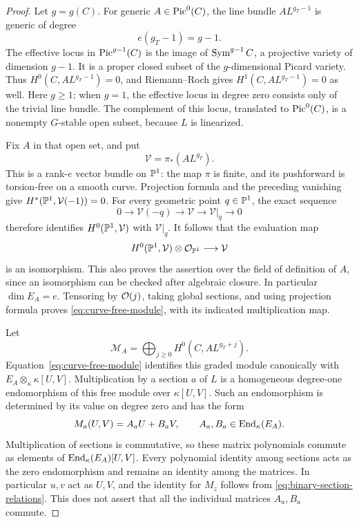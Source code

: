 \begin{proof}
Let \(g=g(C)\).  For generic \(A\in\operatorname{Pic}^0(C)\), the line bundle
\(A L^{g_T-1}\) is generic of degree
\[
 e(g_T-1)=g-1.
\]
The effective locus in \(\operatorname{Pic}^{g-1}(C)\) is the image of
\(\operatorname{Sym}^{g-1}C\), a projective variety of dimension \(g-1\).
It is a proper closed subset of the \(g\)-dimensional Picard
variety.  Thus \(H^0(C,A L^{g_T-1})=0\), and
Riemann--Roch gives \(H^1(C,A L^{g_T-1})=0\) as well.
Here \(g\ge1\); when \(g=1\), the effective locus in degree
zero consists only of the trivial line bundle.
The complement of this locus, translated to \(\operatorname{Pic}^0(C)\),
is a nonempty \(G\)-stable open subset, because \(L\) is
linearized.

Fix \(A\) in that open set, and put
\[
 \mathcal V=\pi_*(A L^{g_T}).
\]
This is a rank-\(e\) vector bundle on \(\mathbb P^1\): the map
\(\pi\) is finite, and its pushforward is torsion-free on a
smooth curve.  Projection formula and the preceding
vanishing give \(H^*(\mathbb P^1,\mathcal V(-1))=0\).
For every geometric point \(q\in\mathbb P^1\), the exact sequence
\[
 0\longrightarrow\mathcal V(-q)\longrightarrow\mathcal V
   \longrightarrow\mathcal V|_q\longrightarrow0
\]
therefore identifies \(H^0(\mathbb P^1,\mathcal V)\) with
\(\mathcal V|_q\).  It follows that the evaluation map
\[
 H^0(\mathbb P^1,\mathcal V)\otimes\mathcal O_{\mathbb P^1}
       \longrightarrow\mathcal V
\]
is an isomorphism.  This also proves the assertion over the
field of definition of \(A\), since an isomorphism can be
checked after algebraic closure.  In particular
\(\dim E_A=e\).  Tensoring by \(\mathcal O(j)\), taking global
sections, and using projection formula proves
\eqref{eq:curve-free-module}, with its indicated multiplication
map.

Let
\[
 \mathcal M_A=\bigoplus_{j\ge0}H^0(C,A L^{g_T+j}).
\]
Equation~\eqref{eq:curve-free-module} identifies this graded
module canonically with \(E_A\otimes_\kappa\kappa[U,V]\).
Multiplication by a section \(a\) of \(L\) is a homogeneous
degree-one endomorphism of this free module over
\(\kappa[U,V]\).  Such an endomorphism is determined by its
value on degree zero and has the form
\[
 M_a(U,V)=A_aU+B_aV,\qquad A_a,B_a\in\operatorname{End}_\kappa(E_A).
\]
Multiplication of sections is commutative, so these matrix
polynomials commute as elements of \(\operatorname{End}_\kappa(E_A)[U,V]\).
Every polynomial identity among sections acts as the zero
endomorphism and remains an identity among the matrices.
In particular \(u,v\) act as \(U,V\), and the identity for
\(M_z\) follows from \eqref{eq:binary-section-relations}.
This does not assert that all the individual matrices
\(A_a,B_a\) commute.


\end{proof}
